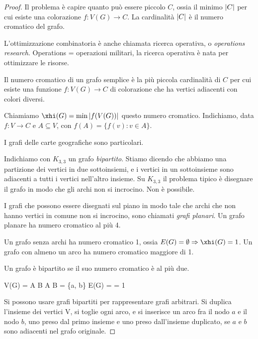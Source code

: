 \begin{proof}
	Il problema \`e capire quanto pu\`o essere piccolo $C$, ossia il minimo $\left\lvert{C}\right\rvert$ per cui esiste una colorazione $f : V(G) \to C$.
	La cardinalit\`a $\left\lvert{C}\right\rvert$ \`e il numero cromatico del grafo.

	L'ottimizzazione combinatoria \`e anche chiamata ricerca operativa, o \emph{operations research}.
	Operations = operazioni militari, la ricerca operativa \`e nata per ottimizzare le risorse.

	\begin{defn}
		Il numero cromatico di un grafo semplice \`e la pi\`u piccola cardinalit\`a di $C$ per cui esiste una funzione $f : V(G) \to C$ di colorazione che ha vertici adiacenti con colori diversi.
	\end{defn}

	Chiamiamo $\xhi(G) = \min \abs{f(V(G))}$ questo numero cromatico.
	Indichiamo, data $f : V \to C$ e $A \subseteq V$, con $f(A) = \{ f(v) : v \in A \}$.

	I grafi delle carte geografiche sono particolari.

	Indichiamo con $K_{3,3}$ un grafo \emph{bipartito}.
	Stiamo dicendo che abbiamo una partizione dei vertici in due sottoinsiemi, e i vertici in un sottoinsieme sono adiacenti a tutti i vertici nell'altro insieme.
	Su $K_{3,3}$ il problema tipico \`e disegnare il grafo in modo che gli archi non si incrocino.
	Non \`e possibile.

	I grafi che possono essere disegnati sul piano in modo tale che archi che non hanno vertici in comune non si incrocino, sono chiamati \emph{grafi planari}.
	Un grafo planare ha numero cromatico al pi\`u 4.

	Un grafo senza archi ha numero cromatico 1, ossia $E(G) = \emptyset \implies \xhi(G) = 1$.
	Un grafo con almeno un arco ha numero cromatico maggiore di 1.

	\begin{defn}
		Un grafo \`e  bipartito se il suo numero cromatico \`e al pi\`u due.
	\end{defn}

	V(G) = A \cup B
	A \cap B = \emptyset
	\forall \{a, b\} \in E(G)  =  = 1

	Si possono usare grafi bipartiti per rappresentare grafi arbitrari.
	Si duplica l'insieme dei vertici V, si toglie ogni arco, e si inserisce un arco fra il nodo $a$ e il nodo $b$, uno preso dal primo insieme e uno preso dall'insieme duplicato, se $a$ e $b$ sono adiacenti nel grafo originale.


\end{proof}
